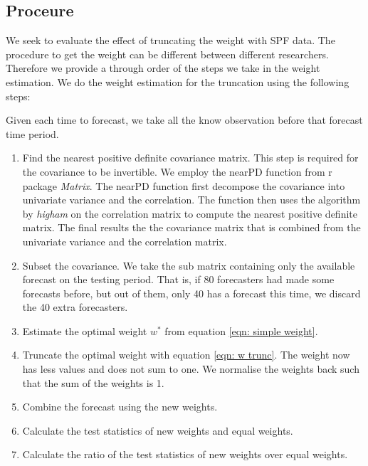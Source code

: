\documentclass[11pt]{article}
\begin{document}
\subsection{Proceure}\label{proceure}

We seek to evaluate the effect of truncating the weight with SPF data.
The procedure to get the weight can be different between different
researchers. Therefore we provide a through order of the steps we take in
the weight estimation. We do the weight estimation for the truncation
using the following steps:

Given each time to forecast, we take all the know observation before
that forecast time period.

\begin{enumerate}
	\def\labelenumi{\arabic{enumi}.}
	\item
	Find the nearest positive definite covariance matrix. This step is
	required for the covariance to be invertible. We employ the nearPD
	function from r package \emph{Matrix}. The nearPD function first
	decompose the covariance into univariate variance and the correlation.
	The function then uses the algorithm by \emph{higham} on the
	correlation matrix to compute the nearest positive definite matrix.
	The final results the the covariance matrix that is combined from the
	univariate variance and the correlation matrix.
	\item
	Subset the covariance. We take the sub matrix containing only the available forecast on the
	testing period. That is, if 80 forecasters had made some forecasts
	before, but out of them, only 40 has a forecast this time, we discard
	the 40 extra forecasters.
	\item
	Estimate the optimal weight \(w^*\) from equation
	\ref{eqn: simple weight}.
	\item
	Truncate the optimal weight with equation \ref{eqn: w trunc}. The weight now
	has less values and does not sum to one. We normalise the weights back such that the sum of the weights is 1.
	\item
	Combine the forecast using the new weights.
	\item
	Calculate the test statistics of new weights and equal weights.
	\item
	Calculate the ratio of the test statistics of new weights over equal weights.
\end{enumerate}
\end{document}
